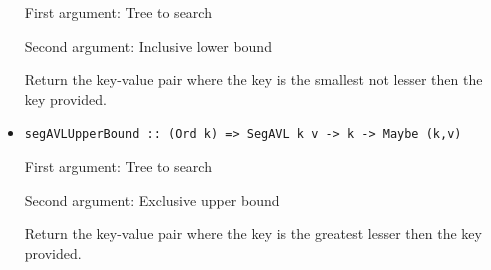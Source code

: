 \documentclass[a4paper,10pt,openany]{article}
\begin{document}
\begin{itemize}
First argument: Tree to search

Second argument: Inclusive lower bound

Return the key-value pair where the key is the smallest not lesser then the key provided.
\item \begin{lstlisting}
segAVLUpperBound :: (Ord k) => SegAVL k v -> k -> Maybe (k,v)
\end{lstlisting}

First argument: Tree to search

Second argument: Exclusive upper bound

Return the key-value pair where the key is the greatest lesser then the key provided.
\end{itemize}
\end{document}
